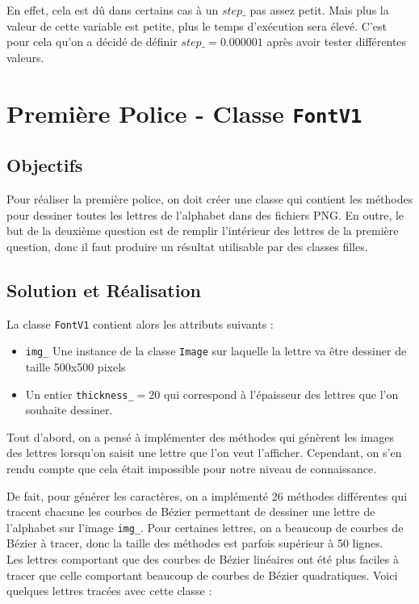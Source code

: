 \documentclass[a4paper, 12pt]{article}
\begin{document}
En effet, cela est dû dans certains cas à un $step\_$ pas assez petit. Mais plus la valeur de cette variable est petite, plus le temps d’exécution sera élevé. C'est pour cela qu'on a décidé de définir $step\_ = 0.000001$ après avoir tester différentes valeurs.

\newpage
\section{Première Police - Classe \texttt{FontV1}}	
\subsection{Objectifs}
Pour réaliser la première police, on doit créer une classe qui contient les méthodes pour dessiner toutes les lettres de l'alphabet dans des fichiers PNG. En outre, le but de la deuxième question est de remplir l'intérieur des lettres de la première question, donc il faut produire un résultat utilisable par des classes filles.

\subsection{Solution et Réalisation}
La classe \texttt{FontV1} contient alors les attributs suivants : 
\begin{itemize}
\item \texttt{img\_} Une instance de la classe \texttt{Image} sur laquelle la lettre va être dessiner de taille 500x500 pixels
\item Un entier \texttt{thickness\_}$= 20$ qui correspond à l'épaisseur des lettres que l'on souhaite dessiner. 
\end{itemize}
\vspace{0.5cm}

Tout d'abord, on a pensé à implémenter des méthodes qui génèrent les images des lettres lorsqu'on saisit une lettre que l'on veut l'afficher. Cependant, on s'en rendu compte que cela était impossible pour notre niveau de connaissance.

De fait, pour générer les caractères, on a implémenté 26 méthodes différentes qui tracent chacune les courbes de Bézier permettant de dessiner une lettre de l'alphabet sur l'image \texttt{img\_}. Pour certaines lettres, on a beaucoup de courbes de Bézier à tracer, donc la taille des méthodes est parfois supérieur à 50 lignes.\\

Les lettres comportant que des courbes de Bézier linéaires ont été plus faciles à tracer que celle comportant beaucoup de courbes de Bézier quadratiques. Voici quelques lettres tracées avec cette classe : 
\end{document}
